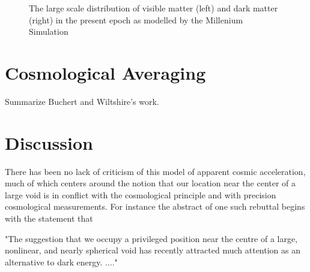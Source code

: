 \begin{figure}[hbtp]
	\centering
	\caption{The large scale distribution of visible matter (left) and dark matter (right) in the present epoch as modelled by the Millenium Simulation}
	\label{fig:MilleniumSimulation}
\end{figure}

\section{Cosmological Averaging}

Summarize Buchert and Wiltshire's work.

\section{Discussion}

There has been no lack of criticism of this model of apparent cosmic acceleration, much of which centers around the notion that our location near the center of a large void is in conflict with the cosmological principle and with precision cosmological measurements. For instance the abstract of one such rebuttal \cite{Moss2010Precision} begins with the statement that

"The suggestion that we occupy a privileged position near the centre of a large, nonlinear, and nearly spherical void has recently attracted much attention as an alternative to dark energy. ...."

